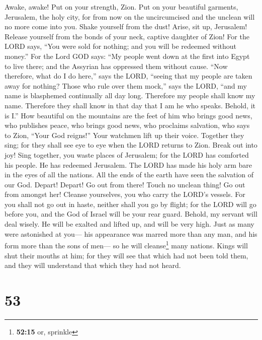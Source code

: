  Awake, awake! Put on your strength, Zion. Put on your
beautiful garments, Jerusalem, the holy city, for from now on the
uncircumcised and the unclean will no more come into you. 
Shake yourself from the dust! Arise, sit up, Jerusalem! Release yourself
from the bonds of your neck, captive daughter of Zion! 
For the LORD says, ``You were sold for nothing; and you will be redeemed
without money.''  For the Lord GOD says: ``My people went
down at the first into Egypt to live there; and the Assyrian has
oppressed them without cause.  ``Now therefore, what do I
do here,'' says the LORD, ``seeing that my people are taken away for
nothing? Those who rule over them mock,'' says the LORD, ``and my name
is blasphemed continually all day long.  Therefore my
people shall know my name. Therefore they shall know in that day that I
am he who speaks. Behold, it is I.''  How beautiful on the
mountains are the feet of him who brings good news, who publishes peace,
who brings good news, who proclaims salvation, who says to Zion, ``Your
God reigns!''  Your watchmen lift up their voice. Together
they sing; for they shall see eye to eye when the LORD returns to Zion.
 Break out into joy! Sing together, you waste places of
Jerusalem; for the LORD has comforted his people. He has redeemed
Jerusalem.  The LORD has made his holy arm bare in the
eyes of all the nations. All the ends of the earth have seen the
salvation of our God.  Depart! Depart! Go out from there!
Touch no unclean thing! Go out from amongst her! Cleanse yourselves, you
who carry the LORD's vessels.  For you shall not go out
in haste, neither shall you go by flight; for the LORD will go before
you, and the God of Israel will be your rear guard. 
Behold, my servant will deal wisely. He will be exalted and lifted up,
and will be very high.  Just as many were astonished at
you--- his appearance was marred more than any man, and his form more
than the sons of men---  so he will cleanse\footnote{\textbf{52:15}
  or, sprinkle} many nations. Kings will shut their mouths at him; for
they will see that which had not been told them, and they will
understand that which they had not heard.

\hypertarget{section-50}{%
\section{53}\label{section-50}}

